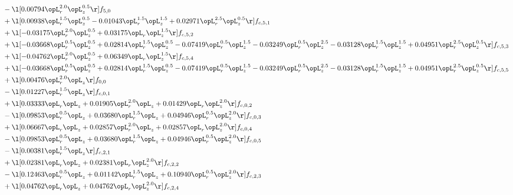 \begin{alignat}{2}
& - \l[  0.00794 \opL_r^{2.0} \opL_z^{0.5}  \r] f_{5,0} \nonumber \\ 
& + \l[  0.00938 \opL_r^{1.5} \opL_z^{0.5}   -0.01043 \opL_r^{1.5} \opL_z^{1.5} +  0.02971 \opL_r^{2.5} \opL_z^{0.5}  \r] f_{c,5,1} \nonumber \\ 
& + \l[  -0.03175 \opL_r^{2.0} \opL_z^{0.5} +  0.03175 \opL_r \opL_z^{1.5}  \r] f_{c,5,2} \nonumber \\ 
& + \l[  -0.03668 \opL_r^{0.5} \opL_z^{0.5} +  0.02814 \opL_r^{1.5} \opL_z^{0.5}   -0.07419 \opL_r^{0.5} \opL_z^{1.5}   -0.03249 \opL_r^{0.5} \opL_z^{2.5}   -0.03128 \opL_r^{1.5} \opL_z^{1.5} +  0.04951 \opL_r^{2.5} \opL_z^{0.5}  \r] f_{c,5,3} \nonumber \\ 
& + \l[  -0.04762 \opL_r^{2.0} \opL_z^{0.5} +  0.06349 \opL_r \opL_z^{1.5}  \r] f_{c,5,4} \nonumber \\ 
& + \l[  -0.03668 \opL_r^{0.5} \opL_z^{0.5} +  0.02814 \opL_r^{1.5} \opL_z^{0.5}   -0.07419 \opL_r^{0.5} \opL_z^{1.5}   -0.03249 \opL_r^{0.5} \opL_z^{2.5}   -0.03128 \opL_r^{1.5} \opL_z^{1.5} +  0.04951 \opL_r^{2.5} \opL_z^{0.5}  \r] f_{c,5,5} \nonumber \\ 
& + \l[  0.00476 \opL_r^{2.0} \opL_z  \r] f_{0,0} \nonumber \\ 
& - \l[  0.01227 \opL_r^{1.5} \opL_z  \r] f_{c,0,1} \nonumber \\ 
& + \l[  0.03333 \opL_r \opL_z +  0.01905 \opL_r^{2.0} \opL_z +  0.01429 \opL_r \opL_z^{2.0}  \r] f_{c,0,2} \nonumber \\ 
& - \l[  0.09853 \opL_r^{0.5} \opL_z +  0.03680 \opL_r^{1.5} \opL_z +  0.04946 \opL_r^{0.5} \opL_z^{2.0}  \r] f_{c,0,3} \nonumber \\ 
& + \l[  0.06667 \opL_r \opL_z +  0.02857 \opL_r^{2.0} \opL_z +  0.02857 \opL_r \opL_z^{2.0}  \r] f_{c,0,4} \nonumber \\ 
& - \l[  0.09853 \opL_r^{0.5} \opL_z +  0.03680 \opL_r^{1.5} \opL_z +  0.04946 \opL_r^{0.5} \opL_z^{2.0}  \r] f_{c,0,5} \nonumber \\ 
& - \l[  0.00381 \opL_r^{1.5} \opL_z  \r] f_{c,2,1} \nonumber \\ 
& + \l[  0.02381 \opL_r \opL_z +  0.02381 \opL_r \opL_z^{2.0}  \r] f_{c,2,2} \nonumber \\ 
& - \l[  0.12463 \opL_r^{0.5} \opL_z +  0.01142 \opL_r^{1.5} \opL_z +  0.10940 \opL_r^{0.5} \opL_z^{2.0}  \r] f_{c,2,3} \nonumber \\ 
& + \l[  0.04762 \opL_r \opL_z +  0.04762 \opL_r \opL_z^{2.0}  \r] f_{c,2,4} \nonumber \\ 

\end{alignat}
